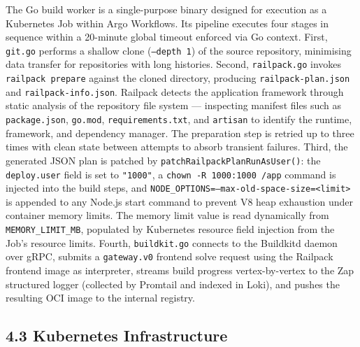 The Go build worker is a single-purpose binary designed for execution as a Kubernetes Job within Argo Workflows. Its pipeline executes four stages in sequence within a 20-minute global timeout enforced via Go context. First, \texttt{git.go} performs a shallow clone (\texttt{--depth 1}) of the source repository, minimising data transfer for repositories with long histories. Second, \texttt{railpack.go} invokes \texttt{railpack prepare} against the cloned directory, producing \texttt{railpack-plan.json} and \texttt{railpack-info.json}. Railpack detects the application framework through static analysis of the repository file system — inspecting manifest files such as \texttt{package.json}, \texttt{go.mod}, \texttt{requirements.txt}, and \texttt{artisan} to identify the runtime, framework, and dependency manager. The preparation step is retried up to three times with clean state between attempts to absorb transient failures. Third, the generated JSON plan is patched by \texttt{patchRailpackPlanRunAsUser()}: the \texttt{deploy.user} field is set to \texttt{"1000"}, a \texttt{chown -R 1000:1000 /app} command is injected into the build steps, and \texttt{NODE\_OPTIONS=--max-old-space-size=<limit>} is appended to any Node.js start command to prevent V8 heap exhaustion under container memory limits. The memory limit value is read dynamically from \texttt{MEMORY\_LIMIT\_MB}, populated by Kubernetes resource field injection from the Job's resource limits. Fourth, \texttt{buildkit.go} connects to the Buildkitd daemon over gRPC, submits a \texttt{gateway.v0} frontend solve request using the Railpack frontend image as interpreter, streams build progress vertex-by-vertex to the Zap structured logger (collected by Promtail and indexed in Loki), and pushes the resulting OCI image to the internal registry.

\subsection*{4.3 Kubernetes Infrastructure}

